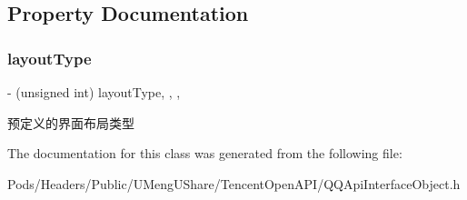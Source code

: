 \subsection{Property Documentation}
\mbox{\label{interface_q_q_api_common_content_object_af0737db63274658041d8a1407057c002}} 
\subsubsection{\texorpdfstring{layout\+Type}{layoutType}}
{\footnotesize\ttfamily -\/ (unsigned int) layout\+Type\hspace{0.3cm}{\ttfamily [read]}, {\ttfamily [write]}, {\ttfamily [nonatomic]}, {\ttfamily [assign]}}

预定义的界面布局类型 

The documentation for this class was generated from the following file\+:\begin{DoxyCompactItemize}
\item 
Pods/\+Headers/\+Public/\+U\+Meng\+U\+Share/\+Tencent\+Open\+A\+P\+I/Q\+Q\+Api\+Interface\+Object.\+h\end{DoxyCompactItemize}
